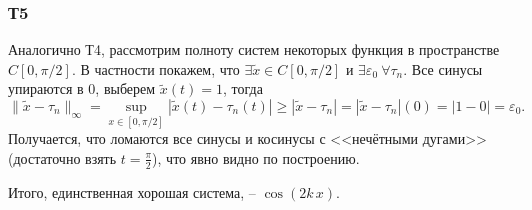 \subsubsection*{Т5}

Аналогично Т4, рассмотрим полноту систем некоторых функция в пространстве $C[0, \pi/2]$. В частности покажем, что $\exists \tilde{x} \in C[0, \pi/2]$ и $\exists \varepsilon_0 \ \forall \tau_n$. Все синусы упираются в 0, выберем $\tilde{x}(t) = 1$, тогда
\begin{equation*}
    \|\tilde{x} - \tau_n\|_{\infty} = \sup_{x \in [0, \pi/2]} |\tilde{x}(t) - \tau_n(t)| \geq |\tilde{x} - \tau_n| = |\tilde{x}-\tau_n|(0) = 
    |1-0| = \varepsilon_0.
\end{equation*}
Получается, что ломаются все синусы и косинусы с <<нечётными дугами>> (достаточно взять $t=\frac{\pi}{2}$), что явно видно по построению. 

Итого, единственная хорошая система, -- $\cos(2k\, x)$. 